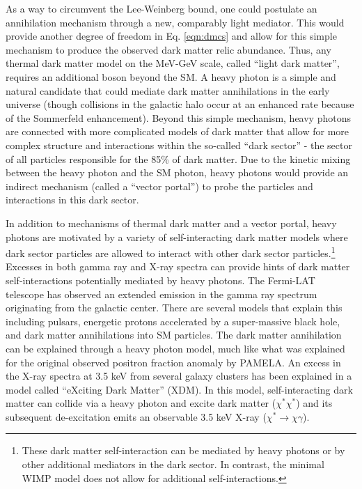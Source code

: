 As a way to circumvent the Lee-Weinberg bound, one could postulate an annihilation mechanism through a new, comparably light mediator. This would provide another degree of freedom in Eq. \ref{eqn:dmcs} and allow for this simple mechanism to produce the observed dark matter relic abundance. Thus, any thermal dark matter model on the MeV-GeV scale, called ``light dark matter'', requires an additional boson beyond the SM. A heavy photon is a simple and natural candidate that could mediate dark matter annihilations in the early universe (though collisions in the galactic halo occur at an enhanced rate because of the Sommerfeld enhancement). Beyond this simple mechanism, heavy photons are connected with more complicated models of dark matter that allow for more complex structure and interactions within the so-called ``dark sector'' - the sector of all particles responsible for the 85\% of dark matter. Due to the kinetic mixing between the heavy photon and the SM photon, heavy photons would provide an indirect mechanism (called a ``vector portal'') to probe the particles and interactions in this dark sector.

In addition to mechanisms of thermal dark matter and a vector portal, heavy photons are motivated by a variety of self-interacting dark matter models where dark sector particles are allowed to interact with other dark sector particles.\footnote{These dark matter self-interaction can be mediated by heavy photons or by other additional mediators in the dark sector. In contrast, the minimal WIMP model does not allow for additional self-interactions.} Excesses in both gamma ray and X-ray spectra can provide hints of dark matter self-interactions potentially mediated by heavy photons. The Fermi-LAT telescope has observed an extended emission in the gamma ray spectrum originating from the galactic center. There are several models that explain this including pulsars, energetic protons accelerated by a super-massive black hole, and dark matter annihilations into SM particles. The dark matter annihilation can be explained through a heavy photon model, much like what was explained for the original observed positron fraction anomaly by PAMELA. An excess in the X-ray spectra at 3.5 keV from several galaxy clusters has been explained in a model called ``eXciting Dark Matter'' (XDM). In this model, self-interacting dark matter can collide via a heavy photon and excite dark matter ($\chi^* \chi^*$) and its subsequent de-excitation emits an observable 3.5 keV X-ray ($\chi^* \rightarrow \chi \gamma$).

